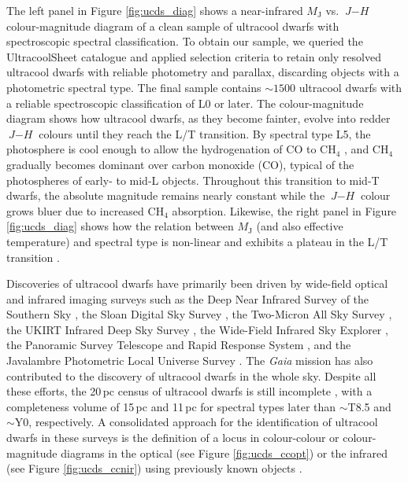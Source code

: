 The left panel in Figure \ref{fig:ucds_diag} shows a near-infrared $M_{\mathrm{J}}$ vs. $\textit{J}-\textit{H}$ colour-magnitude diagram of a clean sample of ultracool dwarfs with spectroscopic spectral classification. To obtain our sample, we queried the UltracoolSheet catalogue \citep{ucs} and applied selection criteria to retain only resolved ultracool dwarfs with reliable photometry and parallax, discarding objects with a photometric spectral type. The final sample contains $\sim1500$ ultracool dwarfs with a reliable spectroscopic classification of L0 or later. The colour-magnitude diagram shows how ultracool dwarfs, as they become fainter, evolve into redder $\textit{J}-\textit{H}$ colours until they reach the L/T transition. By spectral type L5, the photosphere is cool enough to allow the hydrogenation of CO to CH$_4$ \citep{noll2000,canty2015}, and CH$_4$ gradually becomes dominant over carbon monoxide (CO), typical of the photospheres of early- to mid-L objects. Throughout this transition to mid-T dwarfs, the absolute magnitude remains nearly constant while the $\textit{J}-\textit{H}$ colour grows bluer due to increased CH$_4$ absorption. Likewise, the right panel in Figure \ref{fig:ucds_diag} shows how the relation between $M_{\mathrm{J}}$ (and also effective temperature)  and spectral type is non-linear and exhibits a plateau in the L/T transition \citep{golimovsky2004,saumon2008,kirkpatrick2021}.


Discoveries of ultracool dwarfs have primarily been driven by wide-field optical and infrared imaging surveys such as the Deep Near Infrared Survey of the Southern Sky \citep[DENIS;][]{denis}, the Sloan Digital Sky Survey \citep[SDSS;][]{sdss}, the Two-Micron All Sky Survey \citep[2MASS;][]{2mass}, the UKIRT Infrared Deep Sky Survey \citep[UKIDSS; ][]{ukidss}, the Wide-Field Infrared Sky Explorer \citep[WISE;][]{wise}, the Panoramic Survey Telescope and Rapid Response System \citep[Pan-STARRS;][]{panstarrs}, and the Javalambre Photometric Local Universe Survey \citep[J-PLUS;][]{Cenarro2019}. The \textit{Gaia} mission \citep{gaiadr3} has also contributed to the discovery of ultracool dwarfs in the whole sky. Despite all these efforts, the 20\,pc census of ultracool dwarfs is still incomplete \citep{kirkpatrick2024}, with a completeness volume of 15\,pc and 11\,pc for spectral types later than $\sim$T8.5 and $\sim$Y0, respectively. A consolidated approach for the identification of ultracool dwarfs in these surveys is the definition of a locus in colour-colour or colour-magnitude diagrams in the optical (see Figure \ref{fig:ucds_ccopt}) or the infrared (see Figure \ref{fig:ucds_ccnir}) using previously known objects \citep{skrzypek2016,smart2017,panstarrs1,Reyle2018,carnero2019,masbuitrago2022,sarro2023,euclid_ero}.


